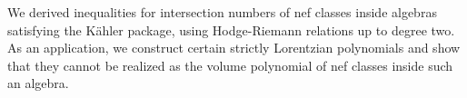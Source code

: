 We derived inequalities for intersection numbers of nef classes inside algebras satisfying the K\"ahler package, using Hodge-Riemann relations up to degree two. As an application, we construct certain strictly Lorentzian polynomials and show that they cannot be realized as the volume polynomial of nef classes inside such an algebra.